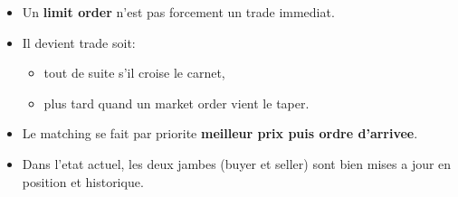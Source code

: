 \documentclass[
]{article}
\providecommand{\tightlist}{%
  \setlength{\itemsep}{0pt}\setlength{\parskip}{0pt}}
\begin{document}
\begin{itemize}
\tightlist
\item
  Un \textbf{limit order} n'est pas forcement un trade immediat.
\item
  Il devient trade soit:

  \begin{itemize}
  \tightlist
  \item
    tout de suite s'il croise le carnet,
  \item
    plus tard quand un market order vient le taper.
  \end{itemize}
\item
  Le matching se fait par priorite \textbf{meilleur prix puis ordre
  d'arrivee}.
\item
  Dans l'etat actuel, les deux jambes (buyer et seller) sont bien mises
  a jour en position et historique.
\end{itemize}
\end{document}
